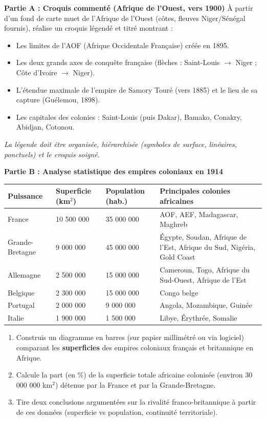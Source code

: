 \documentclass[11pt]{article}
\begin{document}
\begin{exercice}
\textbf{Partie A : Croquis commenté (Afrique de l'Ouest, vers 1900)}
À partir d'un fond de carte muet de l'Afrique de l'Ouest (côtes, fleuves Niger/Sénégal fournis), réalise un croquis légendé et titré montrant :
\begin{itemize}
    \item Les limites de l'AOF (Afrique Occidentale Française) créée en 1895.
    \item Les deux grands axes de conquête française (flèches : Saint-Louis $\rightarrow$ Niger ; Côte d'Ivoire $\rightarrow$ Niger).
    \item L'étendue maximale de l'empire de Samory Touré (vers 1885) et le lieu de sa capture (Guélemou, 1898).
    \item Les capitales des colonies : Saint-Louis (puis Dakar), Bamako, Conakry, Abidjan, Cotonou.
\end{itemize}
\textit{La légende doit être organisée, hiérarchisée (symboles de surface, linéaires, ponctuels) et le croquis soigné.}

\textbf{Partie B : Analyse statistique des empires coloniaux en 1914}
\begin{center}
\begin{tabularx}{\linewidth}{|l|X|X|X|}
\hline
\textbf{Puissance} & \textbf{Superficie (km$^2$)} & \textbf{Population (hab.)} & \textbf{Principales colonies africaines} \\
\hline
France & 10 500 000 & 35 000 000 & AOF, AEF, Madagascar, Maghreb \\
\hline
Grande-Bretagne & 9 000 000 & 45 000 000 & Égypte, Soudan, Afrique de l'Est, Afrique du Sud, Nigéria, Gold Coast \\
\hline
Allemagne & 2 500 000 & 15 000 000 & Cameroun, Togo, Afrique du Sud-Ouest, Afrique de l'Est \\
\hline
Belgique & 2 300 000 & 15 000 000 & Congo belge \\
\hline
Portugal & 2 000 000 & 9 000 000 & Angola, Mozambique, Guinée \\
\hline
Italie & 1 900 000 & 1 500 000 & Libye, Érythrée, Somalie \\
\hline
\end{tabularx}
\end{center}
\begin{enumerate}
    \item Construis un diagramme en barres (sur papier millimétré ou via logiciel) comparant les \textbf{superficies} des empires coloniaux français et britannique en Afrique.
    \item Calcule la part (en \%) de la superficie totale africaine colonisée (environ 30 000 000 km$^2$) détenue par la France et par la Grande-Bretagne.
    \item Tire deux conclusions argumentées sur la rivalité franco-britannique à partir de ces données (superficie vs population, continuité territoriale).
\end{enumerate}


\end{exercice}
\end{document}
